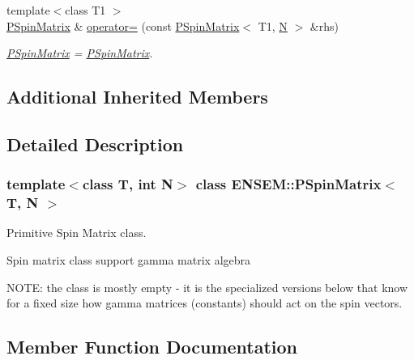 \begin{DoxyCompactItemize}
{\footnotesize template$<$class T1 $>$ }\\\mbox{\hyperlink{classENSEM_1_1PSpinMatrix}{P\+Spin\+Matrix}} \& \mbox{\hyperlink{classENSEM_1_1PSpinMatrix_a0346425dd32cab35d2f76c9d5cca8533}{operator=}} (const \mbox{\hyperlink{classENSEM_1_1PSpinMatrix}{P\+Spin\+Matrix}}$<$ T1, \mbox{\hyperlink{adat__devel_2lib_2hadron_2operator__name__util_8cc_a7722c8ecbb62d99aee7ce68b1752f337}{N}} $>$ \&rhs)
\begin{DoxyCompactList}\small\item\em \mbox{\hyperlink{classENSEM_1_1PSpinMatrix}{P\+Spin\+Matrix}} = \mbox{\hyperlink{classENSEM_1_1PSpinMatrix}{P\+Spin\+Matrix}}. \end{DoxyCompactList}\end{DoxyCompactItemize}
\subsection*{Additional Inherited Members}


\subsection{Detailed Description}
\subsubsection*{template$<$class T, int N$>$\newline
class E\+N\+S\+E\+M\+::\+P\+Spin\+Matrix$<$ T, N $>$}

Primitive Spin Matrix class. 

Spin matrix class support gamma matrix algebra

N\+O\+TE\+: the class is mostly empty -\/ it is the specialized versions below that know for a fixed size how gamma matrices (constants) should act on the spin vectors. 

\subsection{Member Function Documentation}
\mbox{\label{classENSEM_1_1PSpinMatrix_a2a776d9189f8d6fa8f9d9bc6758713c9}} 

